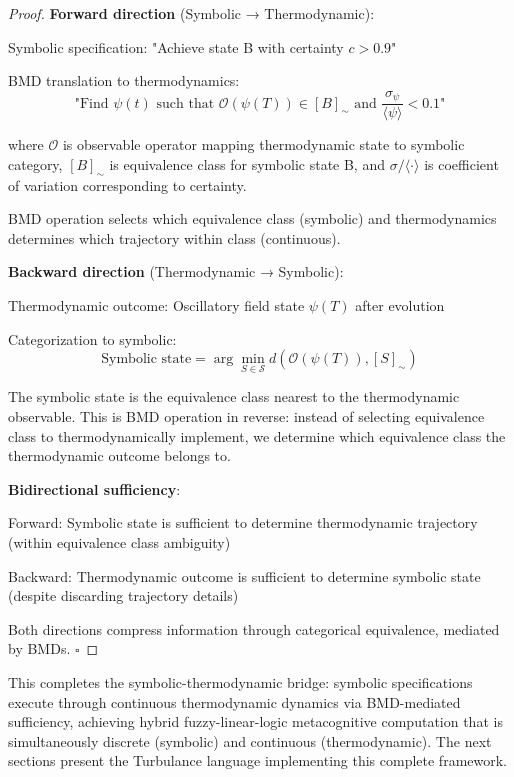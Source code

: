 \begin{proof}
\textbf{Forward direction} (Symbolic → Thermodynamic):

Symbolic specification: "Achieve state B with certainty $c > 0.9$"

BMD translation to thermodynamics:
\begin{equation}
\text{"Find } \psi(t) \text{ such that } \mathcal{O}(\psi(T)) \in [B]_{\sim} \text{ and } \frac{\sigma_{\psi}}{\langle \psi \rangle} < 0.1\text{"}
\end{equation}

where $\mathcal{O}$ is observable operator mapping thermodynamic state to symbolic category, $[B]_{\sim}$ is equivalence class for symbolic state B, and $\sigma/\langle \cdot \rangle$ is coefficient of variation corresponding to certainty.

BMD operation selects which equivalence class (symbolic) and thermodynamics determines which trajectory within class (continuous).

\textbf{Backward direction} (Thermodynamic → Symbolic):

Thermodynamic outcome: Oscillatory field state $\psi(T)$ after evolution

Categorization to symbolic:
\begin{equation}
\text{Symbolic state} = \arg\min_{S \in \mathcal{S}} d(\mathcal{O}(\psi(T)), [S]_{\sim})
\end{equation}

The symbolic state is the equivalence class nearest to the thermodynamic observable. This is BMD operation in reverse: instead of selecting equivalence class to thermodynamically implement, we determine which equivalence class the thermodynamic outcome belongs to.

\textbf{Bidirectional sufficiency}:

Forward: Symbolic state is sufficient to determine thermodynamic trajectory (within equivalence class ambiguity)

Backward: Thermodynamic outcome is sufficient to determine symbolic state (despite discarding trajectory details)

Both directions compress information through categorical equivalence, mediated by BMDs. $\square$
\end{proof}

This completes the symbolic-thermodynamic bridge: symbolic specifications execute through continuous thermodynamic dynamics via BMD-mediated sufficiency, achieving hybrid fuzzy-linear-logic metacognitive computation that is simultaneously discrete (symbolic) and continuous (thermodynamic). The next sections present the Turbulance language implementing this complete framework.

